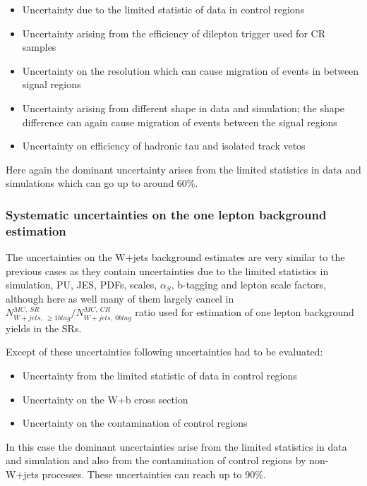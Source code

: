 \begin{itemize} 
\item Uncertainty due to the limited statistic of data in control regions
\item Uncertainty arising from the efficiency of dilepton trigger used for CR samples
\item Uncertainty on the \MET resolution which can cause migration of events in between signal regions
\item Uncertainty arising from different \MET shape in data and simulation; the shape difference can again cause migration of events between the signal regions
\item Uncertainty on efficiency of hadronic tau and isolated track vetos %
\end{itemize}

Here again the dominant uncertainty arises from the limited statistics in data and simulations which can go up to around 60\%.


\subsubsection{Systematic uncertainties on the one lepton background estimation}

The uncertainties on the W+jets background estimates are very similar to the previous cases as they contain uncertainties due to the limited statistics in simulation, PU, JES, PDFs, scales, $\alpha_{S}$, b-tagging and lepton scale factors, although here as well many of them largely cancel in $N^{MC,~SR}_{W+jets,~\geq 1btag}/ N^{MC,~CR}_{W+jets,~0btag}$ ratio used for estimation of one lepton background yields in the SRs.

Except of these uncertainties following uncertainties had to be evaluated:

\begin{itemize} 
\item Uncertainty from the limited statistic of data in control regions
\item Uncertainty on the W+b cross section
\item Uncertainty on the contamination of control regions
\end{itemize}

In this case the dominant uncertainties arise from the limited statistics in data and simulation and also from the contamination of control regions by non-W+jets processes. These uncertainties can reach up to 90\%.

